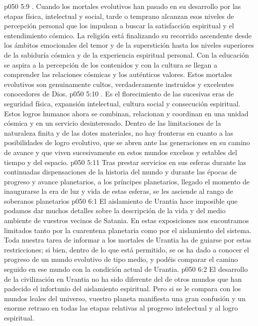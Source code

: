 \vs p050 5:9 . Cuando los mortales evolutivos han pasado en su desarrollo por las etapas física, intelectual y social, tarde o temprano alcanzan esos niveles de percepción personal que los impulsan a buscar la satisfacción espiritual y el entendimiento cósmico. La religión está finalizando su recorrido ascendente desde los ámbitos emocionales del temor y de la superstición hasta los niveles superiores de la sabiduría cósmica y de la experiencia espiritual personal. Con la educación se aspira a la percepción de los contenidos y con la cultura se llegan a comprender las relaciones cósmicas y los auténticos valores. Estos mortales evolutivos son genuinamente cultos, verdaderamente instruidos y excelentes conocedores de Dios.
\vs p050 5:10 . Es el florecimiento de las sucesivas eras de seguridad física, expansión intelectual, cultura social y consecución espiritual. Estos logros humanos ahora se combinan, relacionan y coordinan en una unidad cósmica y en un servicio desinteresado. Dentro de las limitaciones de la naturaleza finita y de las dotes materiales, no hay fronteras en cuanto a las posibilidades de logro evolutivo, que se abren ante las generaciones en su camino de avance y que viven sucesivamente en estos mundos excelsos y estables del tiempo y del espacio.
\vs p050 5:11 \pc Tras prestar servicios en sus esferas durante las continuadas dispensaciones de la historia del mundo y durante las épocas de progreso y avance planetarios, a los príncipes planetarios, llegado el momento de inaugurarse la era de luz y vida de estas esferas, se les asciende al rango de soberanos planetarios
\vs p050 6:1 El aislamiento de Urantia hace imposible que podamos dar muchos detalles sobre la descripción de la vida y del medio ambiente de vuestros vecinos de Satania. En estas exposiciones nos encontramos limitados tanto por la cuarentena planetaria como por el aislamiento del sistema. Toda nuestra tarea de informar a los mortales de Urantia ha de guiarse por estas restricciones; si bien, dentro de lo que está permitido, se os ha dado a conocer el progreso de un mundo evolutivo de tipo medio, y podéis comparar el camino seguido en ese mundo con la condición actual de Urantia.
\vs p050 6:2 El desarrollo de la civilización en Urantia no ha sido diferente del de otros mundos que han padecido el infortunio del aislamiento espiritual. Pero si se le compara con los mundos leales del universo, vuestro planeta manifiesta una gran confusión y un enorme retraso en todas las etapas relativas al progreso intelectual y al logro espiritual.
